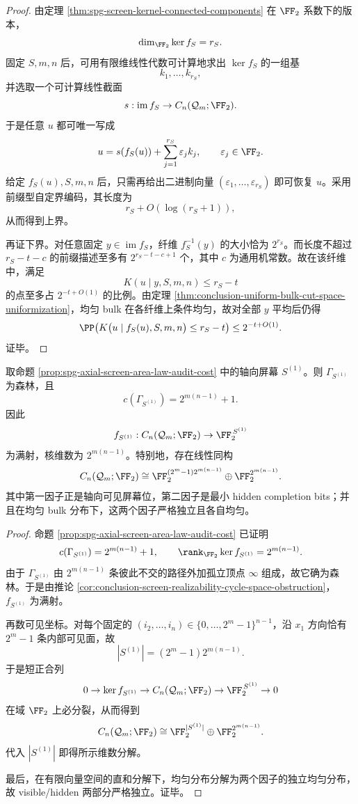 \begin{proof}
由定理 \ref{thm:spg-screen-kernel-connected-components} 在 \(\FF_2\) 系数下的版本，
\[
\dim_{\FF_2}\ker f_S=r_S.
\]
固定 \(S,m,n\) 后，可用有限维线性代数可计算地求出 \(\ker f_S\) 的一组基
\[
k_1,\dots,k_{r_S},
\]
并选取一个可计算线性截面
\[
s:\operatorname{im}f_S\to C_n(\mathcal Q_m;\FF_2).
\]
于是任意 \(u\) 都可唯一写成
\[
u=s(f_S(u))+\sum_{j=1}^{r_S}\varepsilon_j k_j,
\qquad
\varepsilon_j\in\FF_2.
\]
给定 \(f_S(u),S,m,n\) 后，只需再给出二进制向量 \((\varepsilon_1,\dots,\varepsilon_{r_S})\) 即可恢复 \(u\)。采用前缀型自定界编码，其长度为
\[
r_S+O(\log(r_S+1)),
\]
从而得到上界。

再证下界。对任意固定 \(y\in\operatorname{im}f_S\)，纤维 \(f_S^{-1}(y)\) 的大小恰为 \(2^{r_S}\)。而长度不超过 \(r_S-t-c\) 的前缀描述至多有 \(2^{r_S-t-c+1}\) 个，其中 \(c\) 为通用机常数。故在该纤维中，满足
\[
K(u\mid y,S,m,n)\le r_S-t
\]
的点至多占 \(2^{-t+O(1)}\) 的比例。由定理 \ref{thm:conclusion-uniform-bulk-cut-space-uniformization}，均匀 bulk 在各纤维上条件均匀，故对全部 \(y\) 平均后仍得
\[
\PP\!\left(
K\bigl(u\mid f_S(u),S,m,n\bigr)\le r_S-t
\right)\le 2^{-t+O(1)}.
\]
证毕。
\end{proof}

\begin{corollary}\label{cor:conclusion-axial-screen-direct-sum-visible-hidden-split}
取命题 \ref{prop:spg-axial-screen-area-law-audit-cost} 中的轴向屏幕 \(S^{(1)}\)。则 \(\Gamma_{S^{(1)}}\) 为森林，且
\[
c(\Gamma_{S^{(1)}})=2^{m(n-1)}+1.
\]
因此
\[
f_{S^{(1)}}:C_n(\mathcal Q_m;\FF_2)\to \FF_2^{\,S^{(1)}}
\]
为满射，核维数为 \(2^{m(n-1)}\)。特别地，存在线性同构
\[
C_n(\mathcal Q_m;\FF_2)
\cong
\FF_2^{(2^m-1)2^{m(n-1)}}
\oplus
\FF_2^{2^{m(n-1)}}.
\]
其中第一因子正是轴向可见屏幕位，第二因子是最小 hidden completion bits；并且在均匀 bulk 分布下，这两个因子严格独立且各自均匀。
\end{corollary}

\begin{proof}
命题 \ref{prop:spg-axial-screen-area-law-audit-cost} 已证明
\[
c(\Gamma_{S^{(1)}})=2^{m(n-1)}+1,
\qquad
\rank_{\FF_2}\ker f_{S^{(1)}}=2^{m(n-1)}.
\]
由于 \(\Gamma_{S^{(1)}}\) 由 \(2^{m(n-1)}\) 条彼此不交的路径外加孤立顶点 \(\infty\) 组成，故它确为森林。于是由推论 \ref{cor:conclusion-screen-realizability-cycle-space-obstruction}，\(f_{S^{(1)}}\) 为满射。

再数可见坐标。对每个固定的 \((i_2,\dots,i_n)\in\{0,\dots,2^m-1\}^{n-1}\)，沿 \(x_1\) 方向恰有 \(2^m-1\) 条内部可见面，故
\[
|S^{(1)}|=(2^m-1)2^{m(n-1)}.
\]
于是短正合列
\[
0\to \ker f_{S^{(1)}}\to C_n(\mathcal Q_m;\FF_2)\to \FF_2^{\,S^{(1)}}\to 0
\]
在域 \(\FF_2\) 上必分裂，从而得到
\[
C_n(\mathcal Q_m;\FF_2)
\cong
\FF_2^{|S^{(1)}|}
\oplus
\FF_2^{2^{m(n-1)}}.
\]
代入 \(|S^{(1)}|\) 即得所示维数分解。

最后，在有限向量空间的直和分解下，均匀分布分解为两个因子的独立均匀分布，故 visible/hidden 两部分严格独立。证毕。
\end{proof}

